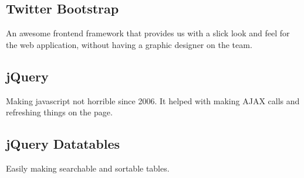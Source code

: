 \documentclass{article}
\begin{document}
\subsection{Twitter Bootstrap}
An awesome frontend framework that provides us with a slick look and feel for the web application, without having a graphic designer on the team.

\subsection{jQuery}
Making javascript not horrible since 2006. It helped with making AJAX calls and refreshing things on the page.

\subsection{jQuery Datatables}
Easily making searchable and sortable tables.



\newpage
\end{document}
